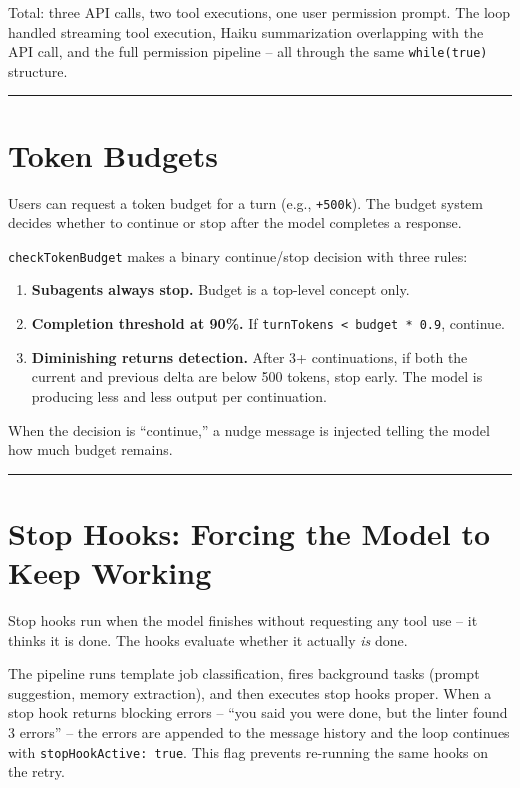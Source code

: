 \documentclass[
  english,
  11pt,
  letterpaper,
]{book}
\providecommand{\tightlist}{%
  \setlength{\itemsep}{0pt}\setlength{\parskip}{0pt}}
\begin{document}
Total: three API calls, two tool executions, one user permission prompt.
The loop handled streaming tool execution, Haiku summarization
overlapping with the API call, and the full permission pipeline -- all
through the same \texttt{while(true)} structure.

\begin{center}\rule{0.5\linewidth}{0.5pt}\end{center}

\section{Token Budgets}\label{token-budgets}

Users can request a token budget for a turn (e.g., \texttt{+500k}). The
budget system decides whether to continue or stop after the model
completes a response.

\texttt{checkTokenBudget} makes a binary continue/stop decision with
three rules:

\begin{enumerate}
\def\labelenumi{\arabic{enumi}.}
\tightlist
\item
  \textbf{Subagents always stop.} Budget is a top-level concept only.
\item
  \textbf{Completion threshold at 90\%.} If
  \texttt{turnTokens\ \textless{}\ budget\ *\ 0.9}, continue.
\item
  \textbf{Diminishing returns detection.} After 3+ continuations, if
  both the current and previous delta are below 500 tokens, stop early.
  The model is producing less and less output per continuation.
\end{enumerate}

When the decision is ``continue,'' a nudge message is injected telling
the model how much budget remains.

\begin{center}\rule{0.5\linewidth}{0.5pt}\end{center}

\section{Stop Hooks: Forcing the Model to Keep
Working}\label{stop-hooks-forcing-the-model-to-keep-working}

Stop hooks run when the model finishes without requesting any tool use
-- it thinks it is done. The hooks evaluate whether it actually
\emph{is} done.

The pipeline runs template job classification, fires background tasks
(prompt suggestion, memory extraction), and then executes stop hooks
proper. When a stop hook returns blocking errors -- ``you said you were
done, but the linter found 3 errors'' -- the errors are appended to the
message history and the loop continues with
\texttt{stopHookActive:\ true}. This flag prevents re-running the same
hooks on the retry.
\end{document}

